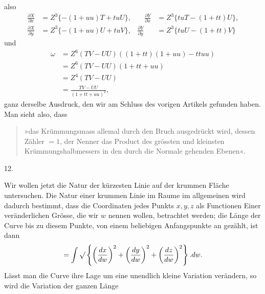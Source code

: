 %
also
\[
\begin{aligned}
\frac{\partial X}{\partial x}&=Z^{3}\{-(1+uu)T+tuU\},&\quad\frac{\partial Y}{\partial x}&=Z^{3}\{tuT-(1+tt)U\},\\
\frac{\partial X}{\partial y}&=Z^{3}\{-(1+uu)U+tuV\},&\frac{\partial Y}{\partial y}&=Z^{3}\{tuU-(1+tt)V\}
\end{aligned}
\]
und
\[
\begin{aligned}
\omega&=Z^{6}(TV-UU)((1+tt)(1+uu)-ttuu)\\
&=Z^{6}(TV-UU)(1+tt+uu)\\
&=Z^{4}(TV-UU)\\
&=\frac{TV-UU}{(1+tt+uu)^{2}},
\end{aligned}
\]
ganz derselbe Ausdruck, den wir am Schluss des vorigen Artikels gefunden haben. Man sieht also, dass
\begin{quote}
»das Krümmungsmass allemal durch den Bruch ausgedrückt wird, dessen Zähler $=1$, der Nenner das Product des grössten und kleinsten Krümmungshalbmessers in den durch die Normale gehenden Ebenen«.
\end{quote}

\begin{center}12.\end{center}
\noindent\hspace*{1.2em}Wir wollen jetzt die Natur der kürzesten Linie auf der krummen Fläche untersuchen. Die Natur einer krummen Linie im Raume im allgemeinen wird dadurch bestimmt, dass die Coordinaten jedes Punkts $x,y,z$ als Functionen Einer veränderlichen Grösse, die wir $w$ nennen wollen, betrachtet werden; die Länge der Curve bis zu diesem Punkte, von einem beliebigen Anfangspunkte an gezählt, ist dann
\[
=\int\mathord{\surd}\left\{\left(\frac{dx}{dw}\right)^{2}+\left(\frac{dy}{dw}\right)^{2}+\left(\frac{dz}{dw}\right)^{2}\right\}.dw.
\]
Lässt man die Curve ihre Lage um eine unendlich kleine Variation verändern, so wird die Variation der ganzen Länge
